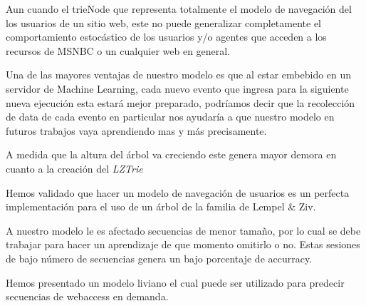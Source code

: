 %
Aun cuando el trieNode que representa totalmente el modelo de navegación del los usuarios de un sitio web, este no puede generalizar completamente el comportamiento estocástico de los usuarios y/o agentes que acceden a los recursos de MSNBC o un cualquier web en general.

Una de las mayores ventajas de nuestro modelo es que al estar embebido en un servidor de Machine Learning, cada nuevo evento que ingresa para la siguiente nueva ejecución esta estará mejor preparado, podríamos decir que la recolección de data de cada evento en particular nos ayudaría a que nuestro modelo en futuros trabajos vaya aprendiendo mas y más precisamente.


A medida que la altura del árbol va creciendo este genera mayor demora en cuanto a la creación del \emph{LZTrie}

Hemos validado que hacer un modelo de navegación de usuarios es un perfecta implementación para el uso de un árbol de la familia de Lempel \& Ziv.

A nuestro modelo le es afectado secuencias de menor tamaño, por lo cual se debe trabajar para hacer un aprendizaje de que momento omitirlo o no. Estas sesiones de bajo número de secuencias genera un bajo porcentaje de accurracy. 



Hemos presentado un modelo liviano el cual puede ser utilizado para predecir secuencias de webaccess en demanda.










%

